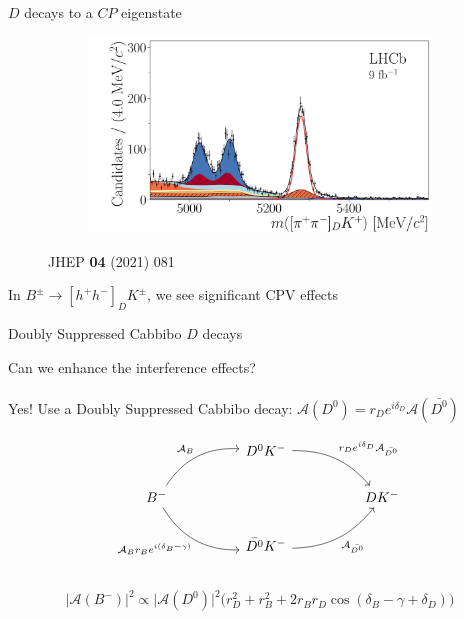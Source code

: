 \documentclass{beamer}
\begin{document}
\begin{frame}{$D$ decays to a $C\!P$ eigenstate}
\begin{figure}
\begin{subfigure}{0.45\textwidth}
    \end{subfigure}%
    \begin{subfigure}{0.45\textwidth}
      \includegraphics[width = 1.0\textwidth]{Plots/B2DK_D2pipi_Plus.pdf}
    \end{subfigure}
    \caption*{\tiny JHEP \textbf{04} (2021) 081}
  \end{figure}
  \vspace{-0.5cm}
  \begin{center}
    \Large In $B^\pm\to[h^+h^-]_DK^\pm$, we see significant CPV effects
  \end{center}
\end{frame}

\begin{frame}[fragile]{Doubly Suppressed Cabbibo $D$ decays}
  \begin{center}
    Can we enhance the interference effects?\\~\\
    Yes! Use a Doubly Suppressed Cabbibo decay: $\mathcal{A}(D^0) = r_De^{i\delta_D}\mathcal{A}(\bar{D^0})$
  \end{center}
  \begin{equation*}
    \begin{tikzcd}[column sep=huge]
      & D^0K^- \arrow[dr, bend left = 25, "r_De^{i\delta_D}\mathcal{A}_{\bar{D^0}}"] & \\
      B^- \arrow[ur, bend left, "\mathcal{A}_B"] \arrow[dr, bend right, "\mathcal{A}_B r_B e^{i(\delta_B - \gamma)}"'] & [5cm] & DK^- \\
      & \bar{D^0}K^- \arrow[ur, bend right = 25, "\mathcal{A}_{\bar{D^0}}"'] & \\
    \end{tikzcd}
  \end{equation*}
  \begin{equation*}
    \lvert\mathcal{A}(B^-)\lvert^2\propto\lvert\mathcal{A}(D^0)\lvert^2\Big(r_D^2 + r_B^2 + 2r_Br_D\cos(\delta_B - \gamma + \delta_D)\Big)
  \end{equation*}
\end{frame}
\end{document}
